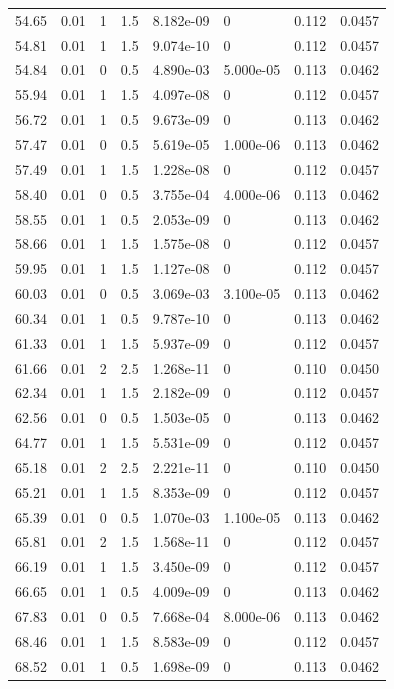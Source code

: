 \documentclass[preview]{standalone}
\begin{document}
{{{\begin{tabular}{L{1.2cm}C{1.2cm} C{0.3cm}C{0.5cm} C{1.4cm}C{1.4cm} C{1.4cm}C{1.4cm}}
  54.65  &  0.01  & 1     & 1.5 &  8.182e-09  & 0  & 0.112 &  0.0457   \\ 
  54.81  &  0.01  & 1     & 1.5 &  9.074e-10  & 0  & 0.112 &  0.0457   \\ 
  54.84  &  0.01  & 0     & 0.5 &  4.890e-03  & 5.000e-05  & 0.113 &  0.0462   \\ 
  55.94  &  0.01  & 1     & 1.5 &  4.097e-08  & 0  & 0.112 &  0.0457   \\ 
  56.72  &  0.01  & 1     & 0.5 &  9.673e-09  & 0  & 0.113 &  0.0462   \\ 
  57.47  &  0.01  & 0     & 0.5 &  5.619e-05  & 1.000e-06  & 0.113 &  0.0462   \\ 
  57.49  &  0.01  & 1     & 1.5 &  1.228e-08  & 0  & 0.112 &  0.0457   \\ 
  58.40  &  0.01  & 0     & 0.5 &  3.755e-04  & 4.000e-06  & 0.113 &  0.0462   \\ 
  58.55  &  0.01  & 1     & 0.5 &  2.053e-09  & 0  & 0.113 &  0.0462   \\ 
  58.66  &  0.01  & 1     & 1.5 &  1.575e-08  & 0  & 0.112 &  0.0457   \\ 
  59.95  &  0.01  & 1     & 1.5 &  1.127e-08  & 0  & 0.112 &  0.0457   \\ 
  60.03  &  0.01  & 0     & 0.5 &  3.069e-03  & 3.100e-05  & 0.113 &  0.0462   \\ 
  60.34  &  0.01  & 1     & 0.5 &  9.787e-10  & 0  & 0.113 &  0.0462   \\ 
  61.33  &  0.01  & 1     & 1.5 &  5.937e-09  & 0  & 0.112 &  0.0457   \\ 
  61.66  &  0.01  & 2     & 2.5 &  1.268e-11  & 0  & 0.110 &  0.0450   \\ 
  62.34  &  0.01  & 1     & 1.5 &  2.182e-09  & 0  & 0.112 &  0.0457   \\ 
  62.56  &  0.01  & 0     & 0.5 &  1.503e-05  & 0  & 0.113 &  0.0462   \\ 
  64.77  &  0.01  & 1     & 1.5 &  5.531e-09  & 0  & 0.112 &  0.0457   \\ 
  65.18  &  0.01  & 2     & 2.5 &  2.221e-11  & 0  & 0.110 &  0.0450   \\ 
  65.21  &  0.01  & 1     & 1.5 &  8.353e-09  & 0  & 0.112 &  0.0457   \\ 
  65.39  &  0.01  & 0     & 0.5 &  1.070e-03  & 1.100e-05  & 0.113 &  0.0462   \\ 
  65.81  &  0.01  & 2     & 1.5 &  1.568e-11  & 0  & 0.112 &  0.0457   \\ 
  66.19  &  0.01  & 1     & 1.5 &  3.450e-09  & 0  & 0.112 &  0.0457   \\ 
  66.65  &  0.01  & 1     & 0.5 &  4.009e-09  & 0  & 0.113 &  0.0462   \\ 
  67.83  &  0.01  & 0     & 0.5 &  7.668e-04  & 8.000e-06  & 0.113 &  0.0462   \\ 
  68.46  &  0.01  & 1     & 1.5 &  8.583e-09  & 0  & 0.112 &  0.0457   \\ 
  68.52  &  0.01  & 1     & 0.5 &  1.698e-09  & 0  & 0.113 &  0.0462   \\ 
\hline 
\end{tabular} 

}}}
\end{document}

